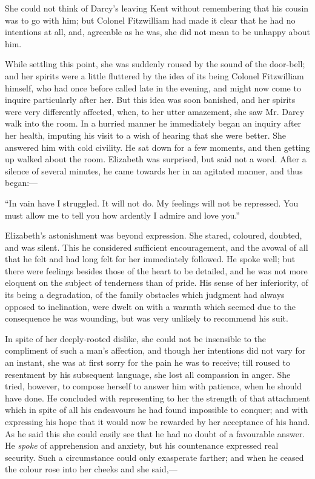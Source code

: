 She could not think of Darcy's leaving Kent without remembering that his cousin was to go with him; but Colonel Fitzwilliam had made it clear that he had no intentions at all, and, agreeable as he was, she did not mean to be unhappy about him.

While settling this point, she was suddenly roused by the sound of the door-bell; and her spirits were a little fluttered by the idea of its being Colonel Fitzwilliam himself, who had once before called late in the evening, and might now come to inquire particularly after her. But this idea was soon banished, and her spirits were very differently affected, when, to her utter amazement, she saw Mr. Darcy walk into the room. In a hurried manner he immediately began an inquiry after her health, imputing his visit to a wish of hearing that she were better. She answered him with cold civility. He sat down for a few moments, and then getting up walked about the room. Elizabeth was surprised, but said not a word. After a silence of several minutes, he came towards her in an agitated manner, and thus began:---

``In vain have I struggled. It will not do. My feelings will not be repressed. You must allow me to tell you how ardently I admire and love you.''

Elizabeth's astonishment was beyond expression. She stared, coloured, doubted, and was silent. This he considered sufficient encouragement, and the avowal of all that he felt and had long felt for her immediately followed. He spoke well; but there were feelings besides those of the heart to be detailed, and he was not more eloquent on the subject of tenderness than of pride. His sense of her inferiority, of its being a degradation, of the family obstacles which judgment had always opposed to inclination, were dwelt on with a warmth which seemed due to the consequence he was wounding, but was very unlikely to recommend his suit.

In spite of her deeply-rooted dislike, she could not be insensible to the compliment of such a man's affection, and though her intentions did not vary for an instant, she was at first sorry for the pain he was to receive; till roused to resentment by his subsequent language, she lost all compassion in anger. She tried, however, to compose herself to answer him with patience, when he should have done. He concluded with representing to her the strength of that attachment which in spite of all his endeavours he had found impossible to conquer; and with expressing his hope that it would now be rewarded by her acceptance of his hand. As he said this she could easily see that he had no doubt of a favourable answer. He \textit{spoke} of apprehension and anxiety, but his countenance expressed real security. Such a circumstance could only exasperate farther; and when he ceased the colour rose into her cheeks and she said,---

